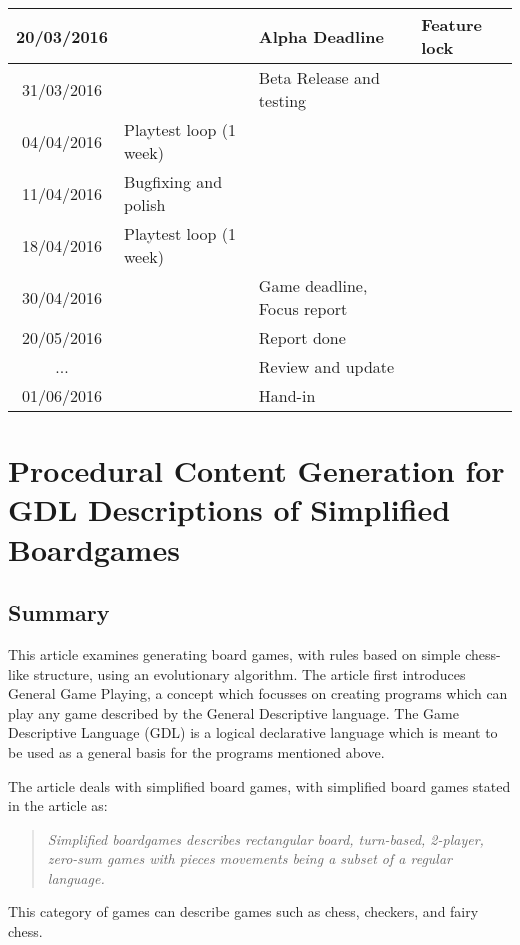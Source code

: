 \documentclass[a4paper,11pt]{article}
\begin{document}
\begin{tabular}{|c|l|l|l|}
\hline
20/03/2016 &  & Alpha Deadline & Feature lock\\
\hline
31/03/2016 &  & Beta Release and testing & \\
\hline
04/04/2016 & Playtest loop (1 week) &  & \\
\hline
11/04/2016 & Bugfixing and polish &  & \\
\hline
18/04/2016 & Playtest loop (1 week) &  & \\
\hline
30/04/2016 &  & Game deadline, Focus report &\\
\hline
20/05/2016 &  & Report done & \\
\hline
... &  & Review and update & \\
\hline
01/06/2016 &  & Hand-in & \\
\hline
\end{tabular}


\pagebreak

\section{Procedural Content Generation for GDL Descriptions of Simplified Boardgames}
\subsection{Summary}
This article examines generating board games, with rules based on simple chess-like structure, using an evolutionary algorithm.
The article first introduces General Game Playing, a concept which focusses on creating programs which can play any game described by the General Descriptive language.
The Game Descriptive Language (GDL) is a logical declarative language which is meant to be used as a general basis for the programs mentioned above.

The article deals with simplified board games, with simplified board games stated in the article\cite{simpboard} as:
\begin{quote}
\textit{Simplified boardgames describes rectangular board, turn-based, 2-player, zero-sum games with pieces movements being a subset of a regular language.}
\end{quote}
This category of games can describe games such as chess, checkers, and fairy chess. 
\end{document}
